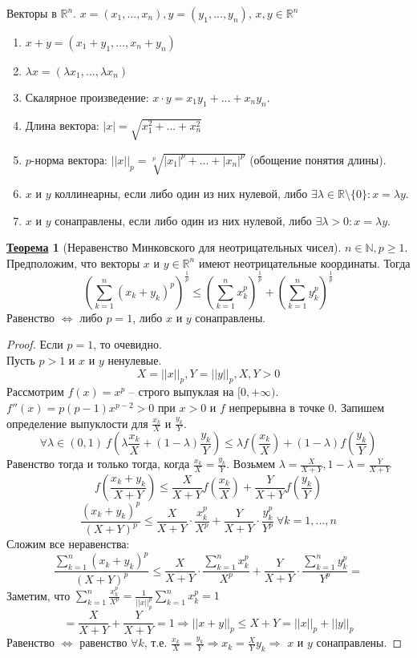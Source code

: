 \documentclass[12pt]{article}
\newenvironment{MyList}[1][4pt]{
  \begin{enumerate}[1.]
  \setlength{\parskip}{0pt}
  \setlength{\itemsep}{#1}
}{       
  \end{enumerate}
}
\def\N{\mathbb{N}}       %
\def\R{\mathbb{R}}       %
\def\SO{\Rightarrow}     %
\def\EQ{\Leftrightarrow} %
\theoremstyle{definition} %
\newtheorem{Thm}{\underline{Теорема}}[subsection] %
\theoremstyle{plain} %
\theoremstyle{remark} %
\begin{document}
Векторы в $\R^n$. $x = (x_1, ..., x_n), y = (y_1, ..., y_n)$, $x, y \in \R^n$ 

\begin{MyList}
    \item $x + y = (x_1 + y_1, ..., x_n + y_n)$ 
    \item $\lambda x = (\lambda x_1, ..., \lambda x_n)$ 
    \item Скалярное произведение: $x \cdot y = x_1 y_1 + ... + x_n y_n$.
    \item Длина вектора: $|x| = \sqrt{x_1^2 + ... + x_n^2}$ 
    \item $p$-норма вектора: $||x||_p = \sqrt[p]{|x_1|^p + ... + |x_n|^p}$ (обощение понятия длины).
    \item $x$ и $y$ коллинеарны, если либо один из них нулевой, либо $\exists \lambda \in \R \setminus \{0\} : x = \lambda y$.
    \item $x$ и $y$ сонаправлены, если либо один из них нулевой, либо $\exists \lambda > 0 : x = \lambda y$.  
\end{MyList}

\begin{Thm}[Неравенство Минковского для неотрицательных чисел]
    $n \in \N, p \geqslant 1$. Предположим, что векторы $x$ и $y \in \R^n$ имеют неотрицательные координаты. Тогда
    \[ \left(\sum_{k=1}^{n} (x_k + y_k)^p \right)^{\frac{1}{p}} \leqslant \left( \sum_{k=1}^{n} x_k^p\right)^{\frac{1}{p}} + \left(\sum_{k = 1}^n y_k^p\right)^{\frac{1}{p}}\]
    Равенство $\EQ$ либо $p = 1$, либо $x$ и $y$ сонаправлены.
\end{Thm}

\begin{proof}
    Если $p = 1$, то очевидно. \\
    Пусть $p > 1$ и $x$ и $y$ ненулевые.
    \[X = ||x||_p, Y = ||y||_p, X, Y > 0\]
    Рассмотрим $f(x) = x^p$ -- строго выпуклая на $[0, +\infty)$.
    $f''(x) = p(p - 1)x^{p - 2} > 0$ при $x > 0$ и $f$ непрерывна в точке $0$.
    Запишем определение выпуклости для $ \frac{x_k}{X}$ и $ \frac{y_k}{Y}$.
    \[\forall \lambda \in (0, 1) \ f\left(\lambda \frac{x_k}{X} + (1 - \lambda)\frac{y_k}{Y}\right) \leqslant \lambda f\left(\frac{x_k}{X}\right) + (1 - \lambda) f\left(\frac{y_k}{Y}\right)\]
    Равенство тогда и только тогда, когда $ \frac{x_k}{X} = \frac{y_k}{Y}$. Возьмем $\lambda = \frac{X}{X + Y}, 1 - \lambda = \frac{Y}{X + Y}$
    \[f \left( \frac{x_k + y_k}{X + Y}\right) \leqslant \frac{X}{X + Y} f \left( \frac{x_k}{X}\right) + \frac{Y}{X + Y} f \left( \frac{y_k}{Y}\right)\]
    \[ \frac{(x_k + y_k)^p}{(X + Y)^p} \leqslant \frac{X}{X + Y} \cdot \frac{x_k^p}{X^p} + \frac{Y}{X + Y} \cdot \frac{y_k^p}{Y^p} \ \forall k = 1, ..., n\]
    Сложим все неравенства:
    \[ \frac{\sum_{k = 1}^n (x_k + y_k)^p}{(X + Y)^p} \leqslant \frac{X}{X + Y} \cdot \frac{\sum_{k=1}^n x_k^p}{X^p} + \frac{Y}{X + Y} \cdot \frac{\sum_{k=1}^n y_k^p}{Y^p} =\]
    Заметим, что $\sum_{k=1}^{n} \frac{x_k^p}{X^p} = \frac{1}{||x||_p^p} \sum_{k=1}^{n} x_k^p = 1$ 
    \[= \frac{X}{X + Y} + \frac{Y}{X + Y} = 1 \SO ||x + y||_p \leqslant X + Y = ||x||_p + ||y||_p\]
    Равенство $\EQ$ равенство $\forall k$, т.е. $ \frac{x_k}{X} = \frac{y_k}{Y} \SO x_k = \frac{X}{Y} y_k \SO$ $x$ и $y$ сонаправлены. 
\end{proof}
\end{document}
